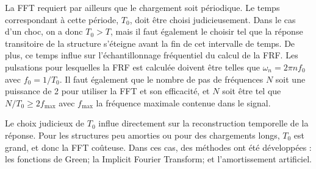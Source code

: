 La FFT requiert par ailleurs que le chargement soit périodique. Le temps correspondant à cette période, $T_0$, doit être choisi judicieusement. Dans le cas d'un choc, on a donc $T_0 > T$, mais il faut également le choisir tel que la réponse transitoire de la structure s'éteigne avant la fin de cet intervalle de temps. De plus, ce temps influe sur l'échantillonnage fréquentiel du calcul de la FRF. Les pulsations pour lesquelles la FRF est calculée doivent être telles que $\omega_n=2\pi n f_0$ avec $f_0=1/T_0$. Il faut également que le nombre de pas de fréquences $N$ soit une puissance de 2 pour utiliser la FFT et son efficacité, et $N$ soit être tel que $N/T_0 \ge 2 f_{\max}$ avec $f_{\max}$ la fréquence maximale contenue dans le signal.

\medskip
Le choix judicieux de $T_0$ influe directement sur la reconstruction temporelle de la réponse. Pour les structures peu amorties ou pour des chargements longs, $T_0$ est grand, et donc la FFT coûteuse. Dans ces cas, des méthodes ont été développées : les fonctions de Green; la Implicit Fourier Transform; et l'amortissement artificiel.